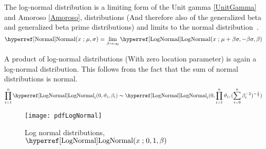 The log-normal distribution is a limiting form of the Unit gamma \eqref{UnitGamma} and Amoroso \eqref{Amoroso},  distributions (And therefore also of the generalized beta and generalized beta prime distributions) and limits to the normal distribution~.
\[
\opr{Normal}(x\given \mu, \sigma)  =   \lim_{\beta\rightarrow\infty} \opr{LogNormal}(x\given \mu + \beta\sigma, -\beta\sigma, \beta) \checked
\notag
\]

A product of log-normal distributions (With zero location parameter) is again a log-normal distribution. This follows from the fact that the sum of normal distributions is normal.
\[
\prod_{i=1}^{n} \opr{LogNormal}_i(0, \vartheta_i, \beta_i) \sim 
\opr{LogNormal}_i(0, \prod_{i=1}^{n} \vartheta_i, (\sum_{i=0}^{n}\beta_i^{-2})^{-\half} ) 
\checked
\notag
\]


\begin{figure}[t]
\begin{center}
\texttt{[image: pdfLogNormal]}
\end{center}
\caption[Log normal distributions]{Log normal distributions, $\opr{LogNormal}(x\given 0, 1, \beta)$}
\end{figure}








